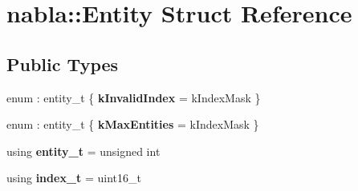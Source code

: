 \hypertarget{structnabla_1_1_entity}{}\section{nabla\+::Entity Struct Reference}
\label{structnabla_1_1_entity}
\subsection*{Public Types}
\begin{DoxyCompactItemize}
\item 
\mbox{\label{structnabla_1_1_entity_af5d356291772b453f7788f76d3b6eda3}} 
enum \+: entity\+\_\+t \{ {\bfseries k\+Invalid\+Index} = k\+Index\+Mask
 \}
\item 
\mbox{\label{structnabla_1_1_entity_adaba9a30fd5fdebbe2a7f02ebe218bd2}} 
enum \+: entity\+\_\+t \{ {\bfseries k\+Max\+Entities} = k\+Index\+Mask
 \}
\item 
\mbox{\label{structnabla_1_1_entity_a0e7d5826cda759dfeb3a81c8175f3b4d}} 
using {\bfseries entity\+\_\+t} = unsigned int
\item 
\mbox{\label{structnabla_1_1_entity_a815ce776f84744656834342e3494be04}} 
using {\bfseries index\+\_\+t} = uint16\+\_\+t
\end{DoxyCompactItemize}
